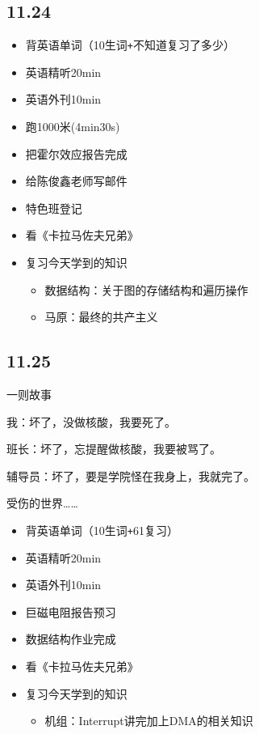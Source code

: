 \documentclass[UTF8]{ctexart}
\begin{document}
\subsection*{11.24}
\begin{itemize}
    \item 背英语单词（10生词\verb|+|不知道复习了多少）
    \item 英语精听20min
    \item 英语外刊10min
    \item 跑1000米(4min30s)
    \item 把霍尔效应报告完成
    \item 给陈俊鑫老师写邮件
    \item 特色班登记
    \item 看《卡拉马佐夫兄弟》
    \item 复习今天学到的知识
          \begin{itemize}
              \item 数据结构：关于图的存储结构和遍历操作
              \item 马原：最终的共产主义
          \end{itemize}
\end{itemize}
\subsection*{11.25}
\centerline{一则故事}

我：坏了，没做核酸，我要死了。

班长：坏了，忘提醒做核酸，我要被骂了。

辅导员：坏了，要是学院怪在我身上，我就完了。

受伤的世界……
\begin{itemize}
    \item 背英语单词（10生词\verb|+|61复习）
    \item 英语精听20min
    \item 英语外刊10min
    \item 巨磁电阻报告预习
    \item 数据结构作业完成
    \item 看《卡拉马佐夫兄弟》
    \item 复习今天学到的知识
          \begin{itemize}
              \item 机组：Interrupt讲完加上DMA的相关知识
          \end{itemize}
\end{itemize}
\end{document}
